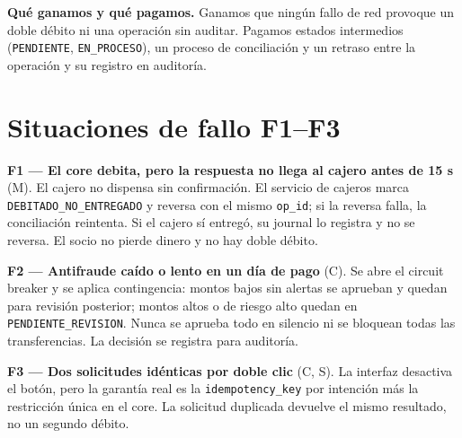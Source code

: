 \documentclass[11pt,a4paper]{article}
\begin{document}
\textbf{Qué ganamos y qué pagamos.} Ganamos que ningún fallo de red provoque un doble débito ni
una operación sin auditar. Pagamos estados intermedios (\texttt{PENDIENTE},
\texttt{EN\_PROCESO}), un proceso de conciliación y un retraso entre la operación y su registro
en auditoría.

\section{Situaciones de fallo F1--F3}
\textbf{F1 --- El core debita, pero la respuesta no llega al cajero antes de 15 s} (M). El
cajero no dispensa sin confirmación. El servicio de cajeros marca
\texttt{DEBITADO\_NO\_ENTREGADO} y reversa con el mismo \texttt{op\_id}; si la reversa falla, la
conciliación reintenta. Si el cajero sí entregó, su journal lo registra y no se reversa. El socio
no pierde dinero y no hay doble débito.

\textbf{F2 --- Antifraude caído o lento en un día de pago} (C). Se abre el circuit breaker y se
aplica contingencia: montos bajos sin alertas se aprueban y quedan para revisión posterior;
montos altos o de riesgo alto quedan en \texttt{PENDIENTE\_REVISION}. Nunca se aprueba todo en
silencio ni se bloquean todas las transferencias. La decisión se registra para auditoría.

\textbf{F3 --- Dos solicitudes idénticas por doble clic} (C, S). La interfaz desactiva el botón,
pero la garantía real es la \texttt{idempotency\_key} por intención más la restricción única en
el core. La solicitud duplicada devuelve el mismo resultado, no un segundo débito.

\end{document}
